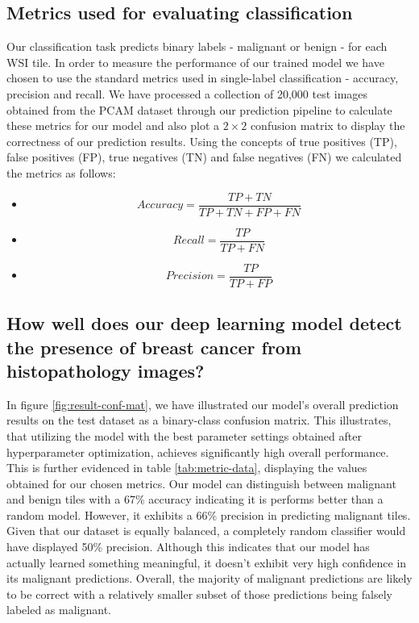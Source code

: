 \documentclass{l4proj}
\begin{document}
\subsection{Metrics used for evaluating classification}
Our classification task predicts binary labels - malignant or benign - for each WSI tile. In order to measure the performance of our trained model we have chosen to use the standard metrics used in single-label classification - accuracy, precision and recall. We have processed a collection of 20,000 test images obtained from the PCAM dataset through our prediction pipeline to calculate these metrics for our model and also plot a \(2 \times 2\) confusion matrix to display the correctness of our prediction results. Using the concepts of true positives (TP), false positives (FP), true negatives (TN) and false negatives (FN) we calculated the metrics as follows:
\begin{itemize}
    \item \begin{equation}
        Accuracy = \frac{TP + TN}{TP + TN + FP + FN}
    \end{equation}

    \item \begin{equation}
        Recall = \frac{TP}{TP + FN}
    \end{equation}

    \item \begin{equation}
        Precision = \frac{TP}{TP + FP}
    \end{equation}
\end{itemize}

\subsection{How well does our deep learning model detect the presence of breast cancer from histopathology images?}
In figure \ref{fig:result-conf-mat}, we have illustrated our model's overall prediction results on the test dataset as a binary-class confusion matrix. This illustrates, that utilizing the model with the best parameter settings obtained after hyperparameter optimization, achieves significantly high overall performance. This is further evidenced in table \ref{tab:metric-data}, displaying the values obtained for our chosen metrics. Our model can distinguish between malignant and benign tiles with a 67\% accuracy indicating it is performs better than a random model. However, it exhibits a 66\% precision in predicting malignant tiles. Given that our dataset is equally balanced, a completely random classifier would have displayed 50\% precision. Although this indicates that our model has actually learned something meaningful, it doesn't exhibit very high confidence in its malignant predictions. Overall, the majority of malignant predictions are likely to be correct with a relatively smaller subset of those predictions being falsely labeled as malignant.
\end{document}

